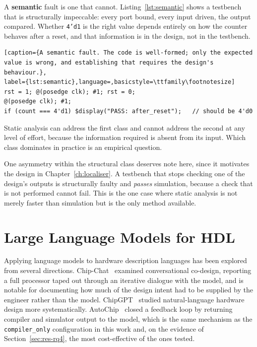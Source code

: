 \documentclass[11pt,a4paper,titlepage=false]{scrreprt}
\begin{document}
A \textbf{semantic} fault is one that cannot. Listing~\ref{lst:semantic} shows a testbench
that is structurally impeccable: every port bound, every input driven, the output compared.
Whether \texttt{4'd1} is the right value depends entirely on how the counter behaves after a
reset, and that information is in the design, not in the testbench.

\begin{lstlisting}[caption={A semantic fault. The code is well-formed; only the expected
value is wrong, and establishing that requires the design's behaviour.},
label={lst:semantic},language=,basicstyle=\ttfamily\footnotesize]
rst = 1; @(posedge clk); #1; rst = 0;
@(posedge clk); #1;
if (count === 4'd1) $display("PASS: after_reset");   // should be 4'd0
\end{lstlisting}

Static analysis can address the first class and cannot address the second at any level of
effort, because the information required is absent from its input. Which class dominates in
practice is an empirical question.

One asymmetry within the structural class deserves note here, since it motivates the design
in Chapter~\ref{ch:localiser}. A testbench that stops checking one of the design's outputs
is structurally faulty and \emph{passes} simulation, because a check that is not performed
cannot fail. This is the one case where static analysis is not merely faster than
simulation but is the only method available.

\section{Large Language Models for HDL}\label{sec:bg-llm-hdl}

Applying language models to hardware description languages has been explored from several
directions. Chip-Chat~\cite{blocklove2023chipchat} examined conversational co-design,
reporting a full processor taped out through an iterative dialogue with the model, and is
notable for documenting how much of the design intent had to be supplied by the engineer
rather than the model. ChipGPT~\cite{chang2023chipgpt} studied natural-language hardware
design more systematically. AutoChip~\cite{thakur2023autochip} closed a feedback loop by
returning compiler and simulator output to the model, which is the same mechanism as the
\texttt{compiler\_only} configuration in this work and, on the evidence of
Section~\ref{sec:res-rq4}, the most cost-effective of the ones tested.
\end{document}
